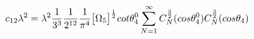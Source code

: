 \begin{equation}
c_{12}\lambda^2 = \lambda^2\frac{1}{3^3}\frac{1}{2^{12}}\frac{1}{\pi^4}\big{[}\Omega_5\big{]}^{\frac{1}{2}}cot{\theta_4^0}\sum_{N=1}^{\infty}C_N^{\frac{3}{2}}(cos{\theta_4^0})C_N^{\frac{3}{2}}(cos{\theta_4})
\end{equation}

